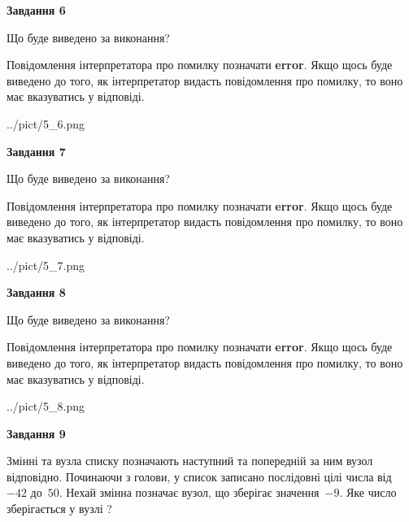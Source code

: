 \documentclass[12pt, ukrainian]{article}
\begin{document}
{\begin {large}
{\begin {center}\textbf{Завдання 6}\end {center}}\par
Що буде виведено за виконання?

Повідомлення інтерпретатора про помилку позначати \textbf{error}.
Якщо щось буде виведено до того, як інтерпретатор видасть повідомлення про помилку, 
то воно має вказуватись у відповіді. \par


\begin{center}
	{../pict/5_6.png}
\end{center}
\newpage

{\begin {center}\textbf{Завдання 7}\end {center}}\par
Що буде виведено за виконання?

Повідомлення інтерпретатора про помилку позначати \textbf{error}.
Якщо щось буде виведено до того, як інтерпретатор видасть повідомлення про помилку, 
то воно має вказуватись у відповіді. \par


\begin{center}
	{../pict/5_7.png}
\end{center}
\newpage

{\begin {center}\textbf{Завдання 8}\end {center}}\par
Що буде виведено за виконання?

Повідомлення інтерпретатора про помилку позначати \textbf{error}.
Якщо щось буде виведено до того, як інтерпретатор видасть повідомлення про помилку, 
то воно має вказуватись у відповіді. \par


\begin{center}
	{../pict/5_8.png}
\end{center}
\newpage

{\begin {center}\textbf{Завдання 9}\end {center}}\par
Змінні  та  вузла списку позначають наступний та попередній за ним вузол відповідно. Починаючи з голови, у список записано послідовні цілі числа від~$-42$ до~$50$. Нехай змінна  позначає вузол, що зберігає значення~$-9$.
Яке число зберігається у вузлі  ?\par
\newpage


\end{large}}
\end{document}
